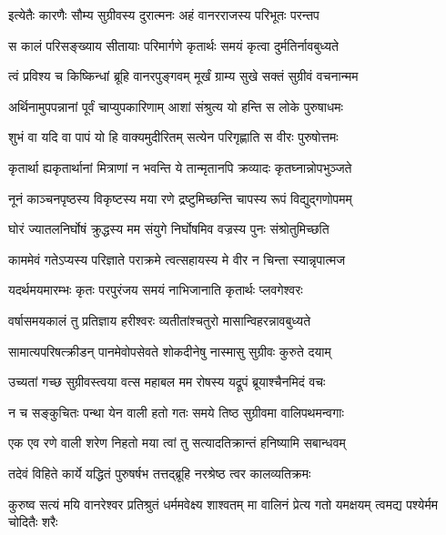 \twolineshloka
{इत्येतैः कारणैः सौम्य सुग्रीवस्य दुरात्मनः}
{अहं वानरराजस्य परिभूतः परन्तप} %

\twolineshloka
{स कालं परिसङ्ख्याय सीतायाः परिमार्गणे}
{कृतार्थः समयं कृत्वा दुर्मतिर्नावबुध्यते} %

\twolineshloka
{त्वं प्रविश्य च किष्किन्धां ब्रूहि वानरपुङ्गवम्}
{मूर्खं ग्राम्य सुखे सक्तं सुग्रीवं वचनान्मम} %

\twolineshloka
{अर्थिनामुपपन्नानां पूर्वं चाप्युपकारिणाम्}
{आशां संश्रुत्य यो हन्ति स लोके पुरुषाधमः} %

\twolineshloka
{शुभं वा यदि वा पापं यो हि वाक्यमुदीरितम्}
{सत्येन परिगृह्णाति स वीरः पुरुषोत्तमः} %

\twolineshloka
{कृतार्था ह्यकृतार्थानां मित्राणां न भवन्ति ये}
{तान्मृतानपि क्रव्यादः कृतघ्नान्नोपभुञ्जते} %

\twolineshloka
{नूनं काञ्चनपृष्ठस्य विकृष्टस्य मया रणे}
{द्रष्टुमिच्छन्ति चापस्य रूपं विद्युद्गणोपमम्} %

\twolineshloka
{घोरं ज्यातलनिर्घोषं क्रुद्धस्य मम संयुगे}
{निर्घोषमिव वज्रस्य पुनः संश्रोतुमिच्छति} %

\twolineshloka
{काममेवं गतेऽप्यस्य परिज्ञाते पराक्रमे}
{त्वत्सहायस्य मे वीर न चिन्ता स्यान्नृपात्मज} %

\twolineshloka
{यदर्थमयमारम्भः कृतः परपुरंजय}
{समयं नाभिजानाति कृतार्थः प्लवगेश्वरः} %

\twolineshloka
{वर्षासमयकालं तु प्रतिज्ञाय हरीश्वरः}
{व्यतीतांश्चतुरो मासान्विहरन्नावबुध्यते} %

\twolineshloka
{सामात्यपरिषत्क्रीडन् पानमेवोपसेवते}
{शोकदीनेषु नास्मासु सुग्रीवः कुरुते दयाम्} %

\twolineshloka
{उच्यतां गच्छ सुग्रीवस्त्वया वत्स महाबल}
{मम रोषस्य यद्रूपं ब्रूयाश्चैनमिदं वचः} %

\twolineshloka
{न च सङ्कुचितः पन्था येन वाली हतो गतः}
{समये तिष्ठ सुग्रीवमा वालिपथमन्वगाः} %

\twolineshloka
{एक एव रणे वाली शरेण निहतो मया}
{त्वां तु सत्यादतिक्रान्तं हनिष्यामि सबान्धवम्} %

\twolineshloka
{तदेवं विहिते कार्ये यद्धितं पुरुषर्षभ}
{तत्तद्ब्रूहि नरश्रेष्ठ त्वर कालव्यतिक्रमः} %

\fourlineindentedshloka
{कुरुष्व सत्यं मयि वानरेश्वर}
{प्रतिश्रुतं धर्ममवेक्ष्य शाश्वतम्}
{मा वालिनं प्रेत्य गतो यमक्षयम्}
{त्वमद्य पश्येर्मम चोदितैः शरैः} %

